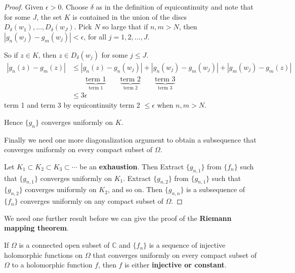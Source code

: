 \documentclass{article}
\begin{document}
\begin{proof}
Given $\epsilon > 0$. Choose $\delta$ as in the definition of equicontinuity and note that for some $J$, the set $K$ is contained in the union of the discs $D_\delta(w_1), \dots, D_\delta(w_J)$. Pick $N$ so large that if $n, m > N$, then $|g_n(w_j) - g_m(w_j)| < \epsilon$, for all $j = 1, 2, \dots, J$.

So if $z \in K$, then $z \in D_\delta(w_j)$ for some $j \le J$.
\begin{align*}
|g_n(z) - g_m(z)| &\le |g_n(z) - g_n(w_j)| + |g_n(w_j) - g_m(w_j)| + |g_m(w_j) - g_m(z)| \\
&\qquad \underbrace{\text{term } 1}_{\text{term } 1} \qquad \underbrace{\text{term } 2}_{\text{term } 2} \qquad \underbrace{\text{term } 3}_{\text{term } 3} \\
&\le 3\epsilon
\end{align*}
term 1 and term 3 by equicontinuity
term 2 $\le \epsilon$ when $n, m > N$.

Hence $\{g_n\}$ converges uniformly on $K$.

Finally we need one more diagonalization argument to obtain a subsequence that converges uniformly on every compact subset of $\Omega$.

Let $K_1 \subset K_2 \subset K_3 \subset \cdots$ be an \textbf{exhaustion}. Then
Extract $\{g_{n, 1}\}$ from $\{f_n\}$ such that $\{g_{n, 1}\}$ converges uniformly on $K_1$. Extract $\{g_{n, 2}\}$ from $\{g_{n, 1}\}$ such that $\{g_{n, 2}\}$ converges uniformly on $K_2$, and so on.
Then $\{g_{n, n}\}$ is a subsequence of $\{f_n\}$ converges uniformly on any compact subset of $\Omega$.
\end{proof}

We need one further result before we can give the proof of the \textbf{Riemann mapping theorem}.

\begin{proposition}
\label{prop:3.5}
If $\Omega$ is a connected open subset of $\mathbb{C}$ and $\{f_n\}$ is a sequence of injective holomorphic functions on $\Omega$ that converges uniformly on every compact subset of $\Omega$ to a holomorphic function $f$, then $f$ is either \textbf{injective or constant}.
\end{proposition}
\end{document}
